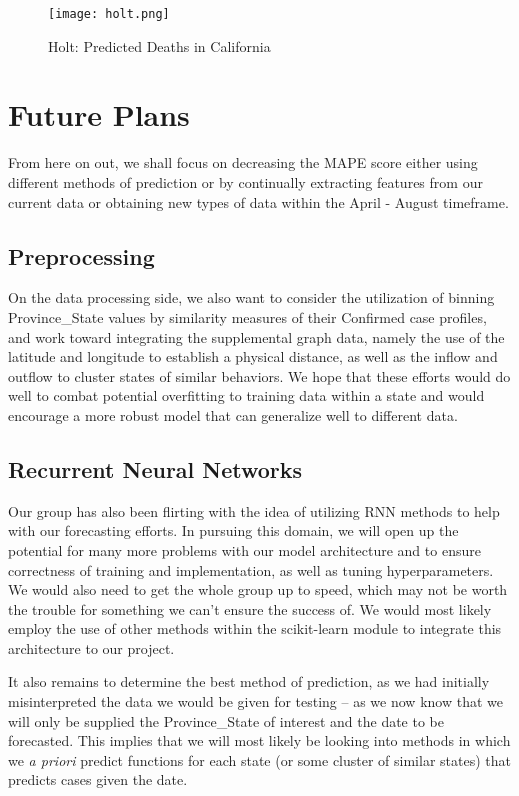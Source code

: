 \documentclass[sigconf]{acmart}
\begin{document}
\begin{figure}
  \centering
  \texttt{[image: holt.png]}
  \caption{Holt: Predicted Deaths in California}
\end{figure}

\section{Future Plans}

From here on out, we shall focus on decreasing the MAPE score either using
different methods of prediction or by continually extracting features from our
current data or obtaining new types of data within the April - August
timeframe.

\subsection{Preprocessing}

On the data processing side, we also want to consider the utilization of
binning Province\_State values by similarity measures of their Confirmed case
profiles, and work toward integrating the supplemental graph data, namely the
use of the latitude and longitude to establish a physical distance, as well as
the inflow and outflow to cluster states of similar behaviors. We hope that
these efforts would do well to combat potential overfitting to training data
within a state and would encourage a more robust model that can generalize well
to different data.

\subsection{Recurrent Neural Networks}

Our group has also been flirting with the idea of utilizing RNN methods to help
with our forecasting efforts. In pursuing this domain, we will open up the
potential for many more problems with our model architecture and to ensure
correctness of training and implementation, as well as tuning hyperparameters.
We would also need to get the whole group up to speed, which may not be worth
the trouble for something we can’t ensure the success of. We would most likely
employ the use of other methods within the scikit-learn module to integrate
this architecture to our project.
 
It also remains to determine the best method of prediction, as we had initially
misinterpreted the data we would be given for testing – as we now know that we
will only be supplied the Province\_State of interest and the date to be
forecasted. This implies that we will most likely be looking into methods in
which we \emph{a priori} predict functions for each state (or some cluster of
similar states) that predicts cases given the date.




\end{document}

